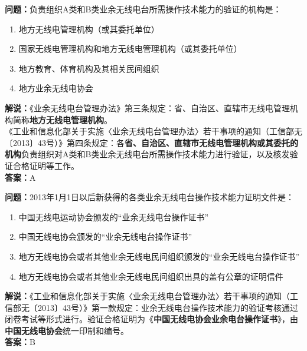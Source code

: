 \documentclass{ctexbook}
\begin{document}
\bigskip


\noindent\textbf{问题：}负责组织A类和B类业余无线电台所需操作技术能力的验证的机构是：
\begin{enumerate}[label=\Alph*), leftmargin=3em]
	\item 地方无线电管理机构（或其委托单位）
	\item 国家无线电管理机构和地方无线电管理机构（或其委托单位）
	\item 地方教育、体育机构及其相关民间组织
	\item 地方业余无线电协会
\end{enumerate}
\noindent\textbf{解说：}《业余无线电台管理办法》第三条规定：省、自治区、直辖市无线电管理机构简称\textbf{地方无线电管理机构}。\\
《工业和信息化部关于实施〈业余无线电台管理办法〉若干事项的通知（工信部无〔2013〕43号）》第四条规定：各\textbf{省、自治区、直辖市无线电管理机构或其委托的机构}负责组织对A类和B类业余无线电台所需操作技术能力进行验证，以及核发验证合格证明等工作。\\\noindent\textbf{答案：}A



\bigskip


\noindent\textbf{问题：}2013年1月1日以后新获得的各类业余无线电台操作技术能力证明文件是：
\begin{enumerate}[label=\Alph*), leftmargin=3em]
	\item 中国无线电运动协会颁发的“业余无线电台操作证书”
	\item 中国无线电协会颁发的“业余无线电台操作证书”
	\item 地方无线电协会或者其他业余无线电民间组织颁发的“业余无线电台操作证书”
	\item 地方无线电协会或者其他业余无线电民间组织出具的盖有公章的证明信件
\end{enumerate}
\noindent\textbf{解说：}《工业和信息化部关于实施〈业余无线电台管理办法〉若干事项的通知（工信部无〔2013〕43号）》第一款规定：业余无线电台操作技术能力的验证考核通过闭卷考试等形式进行。验证合格证明为《\textbf{中国无线电协会业余电台操作证书}》，由\textbf{中国无线电协会}统一印制和编号。\\\noindent\textbf{答案：}B



\bigskip
\end{document}
